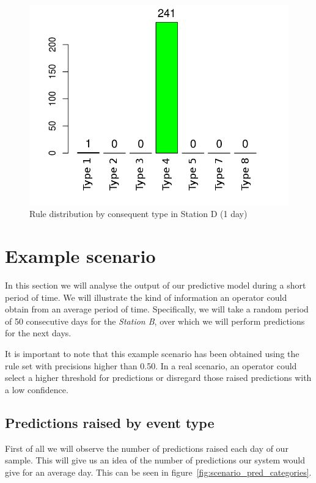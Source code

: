 \begin{figure}[hbtp]
\includegraphics[width=\textwidth]{img/conseqtypes_sev1.png}
\caption{Rule distribution by consequent type in Station D (1 day)} \label{fig:conseqtypes_sev1}
\end{figure}


\section{Example scenario}
\label{sec:scenario}

In this section we will analyse the output of our predictive model during a short period of time. We will illustrate the kind of information an operator could obtain from an average period of time. Specifically, we will take a random period of 50 consecutive days for the \emph{Station B}, over which we will perform predictions for the next days.

It is important to note that this example scenario has been obtained using the rule set with precisions higher than 0.50. In a real scenario, an operator could select a higher threshold for predictions or disregard those raised predictions with a low confidence.

\subsection{Predictions raised by event type}
First of all we will observe the number of predictions raised each day of our sample. This will give us an idea of the number of predictions our system would give for an average day. This can be seen in figure~\ref{fig:scenario_pred_categories}.

